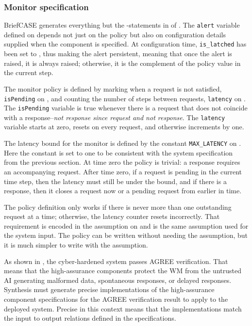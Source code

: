 \subsubsection{Monitor specification}
BriefCASE generates everything but the
-statements in  of
.
The
\texttt{alert} variable defined on  depends
not just on the policy but also on configuration details supplied when
the component is specified.  At configuration
time, \texttt{is\_latched} has been set to , thus making
the alert persistent, meaning that once the alert is raised, it is
always raised; otherwise, it is the complement of the policy value in
the current step.

The monitor policy is defined by marking when a request is not
satisfied, \texttt{isPending} on , and
counting the number of steps between requests, \texttt{latency} on
.  The \texttt{isPending} variable is true
whenever there is a request that does not coincide with a
response--\emph{not response since request and not response}.  The
\texttt{latency} variable starts at zero, resets on every request, and
otherwise increments by one.

The latency bound for the monitor is defined by the constant
\texttt{MAX\_LATENCY} on .  Here the constant
is set to one to be consistent with the system specification from the
previous section.  At time zero the policy is trivial: a response
requires an accompanying request.  After time zero, if a request is
pending in the current time step, then the latency must still be under
the bound, and if there is a response, then it closes a request now or
a pending request from earlier in time.

The policy definition only works if there is never more than one
outstanding request at a time; otherwise, the latency counter resets
incorrectly.  That requirement is encoded in the assumption on
 and is the same assumption used for the
system input.  The policy can be written without needing the
assumption, but it is much simpler to write with the assumption.

As shown in , the cyber-hardened
system passes AGREE verification.  That means that the high-assurance
components protect the WM from the untrusted AI generating malformed
data, spontaneous responses, or delayed responses.  Synthesis must
generate precise implementations of the high-assurance component
specifications for the AGREE verification result to apply to the
deployed system.  Precise in this context means that the
implementations match the input to output relations defined in the
specifications.
